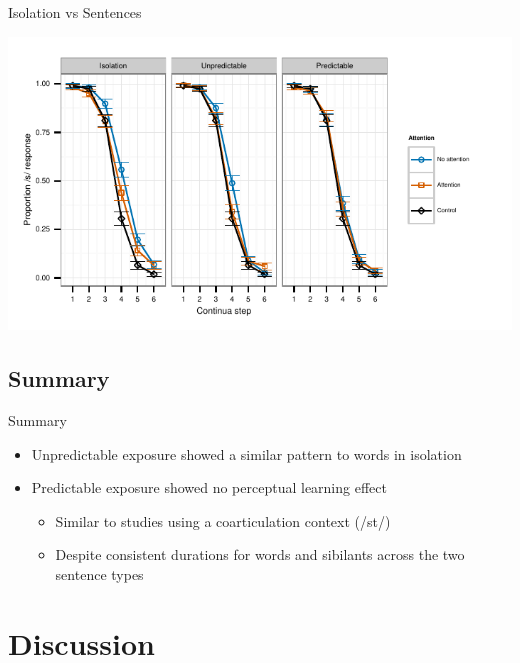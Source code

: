 \documentclass{beamer}
\begin{document}
\begin{frame}{Isolation vs Sentences}

\includegraphics{graphs/exp23_categresults_present}
\end{frame}

\subsection{Summary}

\begin{frame}{Summary}

\begin{itemize}
\item Unpredictable exposure showed a similar pattern to words in isolation
\item Predictable exposure showed no perceptual learning effect
\begin{itemize}
\item Similar to studies using a coarticulation context (/st\textturnr/)
\item Despite consistent durations for words and sibilants across the two sentence types
\end{itemize}
\end{itemize}

\end{frame}

\section{Discussion}
\end{document}
